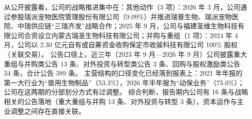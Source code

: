  从公开披露看，公司的战略推进集中在：其他动作（3 项）：2026 年 3 月，公司通过参股瑞派宠物医院管理股份有限公司（9.09\%）并推进瑞普生物、瑞派宠物医院、中瑞供应链“三瑞齐发”战略合作；2025 年 9 月，公司与福建圣维生物科技有限公司合资设立内蒙古瑞圣生物科技有限公司；并购与重组（1 项）：2024 年 4 月，公司以 2.30 亿元自有或自筹资金收购保定市收骏科技有限公司 100\% 股权（关联交易）。 公告口径上，近三年（2023 年 9 月---2026 年 9 月）公司披露重大重组与并购类公告 13 条、对外投资与转型类公告 3 条、回购与股权激励类公告 34 条，合计公告 389 条。 主营结构的口径变化已经落到报表上：2021 年年报的第一大行业为“兽用生物制品”（53.3\%），2026 年半年报为“动保业务”（75.0\%）；公司在这两期的分部划分方式有过调整。 综合判断，报告期内公司有 16 条与战略相关的公告落地（重大重组与并购 13 条、对外投资与转型 3 条），资本运作与主业调整之间存在直接关联。

